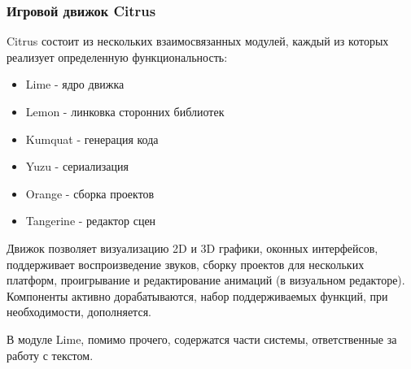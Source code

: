 \documentclass{fefu}
\begin{document}
			\subsubsection{Игровой движок Citrus}
				\par Citrus состоит из нескольких взаимосвязанных модулей, каждый из которых
				реализует определенную функциональность: \cite{CitrusRepo}
				\begin{itemize}
					\item Lime - ядро движка
					\item Lemon - линковка сторонних библиотек
					\item Kumquat - генерация кода
					\item Yuzu - сериализация
					\item Orange - сборка проектов
					\item Tangerine - редактор сцен
				\end{itemize}
				\par Движок позволяет визуализацию 2D и 3D графики, оконных интерфейсов,
				поддерживает воспроизведение звуков, сборку проектов для нескольких платформ,
				проигрывание и редактирование анимаций (в визуальном редакторе). Компоненты
				активно дорабатываются, набор поддерживаемых функций, при необходимости,
				дополняется.
				\par В модуле Lime, помимо прочего, содержатся части системы, ответственные за
				работу с текстом.
\end{document}
